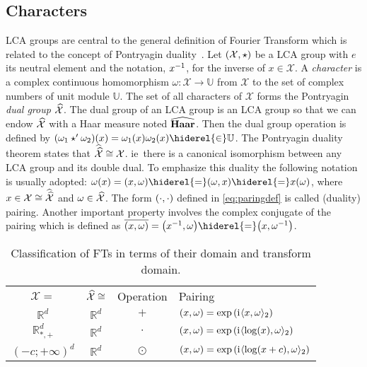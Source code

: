 \subsection{Characters}
\label{subsec:character} \acs{LCA} groups are central to the general definition
of Fourier Transform which is related to the concept of Pontryagin
duality~\citep{folland1994course}.  Let $(\mathcal{X}, \star)$ be a \ac{LCA}
group with $e$ its neutral element and the notation, ${x}^{-1}$, for the inverse
of $x \in \mathcal{X}$. A \emph{character} is a complex continuous homomorphism
$\omega:\mathcal{X}\to\mathbb{U}$ from $\mathcal{X}$ to the set of complex
numbers of unit module $\mathbb{U}$. The set of all characters of $\mathcal{X}$
forms the Pontryagin \emph{dual  group} $\widehat{\mathcal{X}}$. The dual group of
an \ac{LCA} group is an \ac{LCA} group so that we can endow
$\widehat{\mathcal{X}}$ with a  Haar measure noted $\widehat{\mathbf{Haar}}$. Then
the dual group operation is defined by $(\omega_1 \groupop'
\omega_2)(x)=\omega_1(x)\omega_2(x) \hiderel{\in} \mathbb{U}$.  The Pontryagin
duality theorem states that $\widehat{\widehat{\mathcal{X}}}\cong \mathcal{X}$.
\acs{ie}~there is a canonical isomorphism between any \ac{LCA} group and its
double dual. To emphasize this duality the following notation is usually
adopted: $\label{eq:paringdef} \omega(x) = \pairing{x, \omega} \hiderel{=}
\pairing{\omega, x} \hiderel{=} x(\omega)$, where
$x\in\mathcal{X}\cong\widehat{\widehat{\mathcal{X}}}$ and
$\omega\in\widehat{\mathcal{X}}$. The form $(\cdot,\cdot)$ defined in
\cref{eq:paringdef} is called (duality) pairing. Another important property
involves the complex conjugate of the pairing which is defined as
$\conj{\pairing{x, \omega}} = \pairing*{\inv{x}, \omega} \hiderel{=}
\pairing*{x, \inv{\omega}}$.
\begin{table}[t!]
    \caption{Classification of \acl{FT}s in terms of their domain and transform
    domain.}
    \label{tab:dual_and_pairing}
    \centering
    \begin{tabularx}{\textwidth}{cccX}
        \toprule
            \multicolumn{1}{c}{$\mathcal{X}=$} &
            \multicolumn{1}{c}{$\widehat{\mathcal{X}}\cong$} &
            \multicolumn{1}{c}{Operation} & \multicolumn{1}{l}{Pairing} \\
        \cmidrule{1-4}
            $\mathbb{R}^d$ & $\mathbb{R}^d$ & $+$ & $(x,\omega) =
            \exp\left({\mathrm{i}\mkern1mu} \langle x, \omega\rangle_2\right)$ \\ $\mathbb{R}^d_{*,+}$ &
            $\mathbb{R}^d$ & $\cdot$ & $(x,\omega) =\exp\left( {\mathrm{i}\mkern1mu}
            \langle\log(x), \omega\rangle_2 \right)$ \\ $(-c;+\infty)^d$ &
            $\mathbb{R}^d$ & $\odot$ & $(x,\omega) =\exp\left( {\mathrm{i}\mkern1mu}
            \langle\log(x+c), \omega\rangle_2 \right)$ \\
        \bottomrule
    \end{tabularx}
\end{table}
